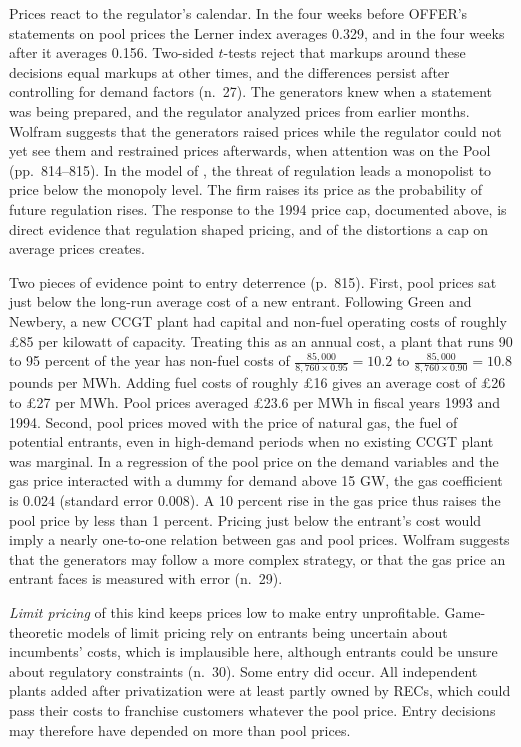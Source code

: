 Prices react to the regulator's calendar. In the four weeks before OFFER's statements on pool prices the Lerner index
averages 0.329, and in the four weeks after it averages 0.156. Two-sided $t$-tests reject that markups around these
decisions equal markups at other times, and the differences persist after controlling for demand factors (n.~27). The
generators knew when a statement was being prepared, and the regulator analyzed prices from earlier months. Wolfram
suggests that the generators raised prices while the regulator could not yet see them and restrained prices afterwards,
when attention was on the Pool (pp.~814--815). In the model of \citet{GlazerMcMillan1992}, the threat of regulation
leads a monopolist to price below the monopoly level. The firm raises its price as the probability of future
regulation rises. The response to the 1994 price cap, documented above, is direct evidence that regulation shaped
pricing, and of the distortions a cap on average prices creates.

Two pieces of evidence point to entry deterrence (p.~815). First, pool prices sat just below the long-run average cost
of a new entrant. Following Green and Newbery, a new CCGT plant had capital and non-fuel operating costs of roughly
\pounds 85 per kilowatt of capacity. Treating this as an annual cost, a plant that runs 90 to 95 percent of the year has
non-fuel costs of $\frac{85{,}000}{8{,}760 \times 0.95} = 10.2$ to $\frac{85{,}000}{8{,}760 \times 0.90} = 10.8$ pounds
per MWh. Adding
fuel costs of roughly \pounds 16 gives an average cost of \pounds 26 to \pounds 27 per MWh. Pool prices averaged
\pounds 23.6 per MWh in fiscal years 1993 and 1994. Second, pool prices moved with the price of natural gas, the fuel
of potential entrants, even in high-demand periods when no existing CCGT plant was marginal. In a regression of the
pool price on the demand variables and the gas price interacted with a dummy for demand above 15 GW, the gas coefficient
is 0.024 (standard error 0.008). A 10 percent rise in the gas price thus raises the pool price by less than 1 percent.
Pricing just below the entrant's cost would imply a nearly one-to-one relation between gas and pool prices. Wolfram
suggests that the generators may follow a more complex strategy, or that the gas price an entrant faces is measured
with error (n.~29).

\emph{Limit pricing} of this kind keeps prices low to make entry unprofitable. Game-theoretic models of limit pricing
rely on entrants being uncertain about incumbents' costs, which is implausible here, although entrants could be unsure
about regulatory constraints (n.~30). Some entry did occur. All independent plants added after privatization were at
least partly owned by RECs, which could pass their costs to franchise customers whatever the pool price. Entry decisions
may therefore have depended on more than pool prices.

